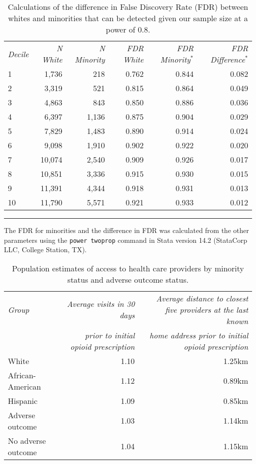 \documentclass[9pt,twoside]{pnas-new}
\begin{document}
\begin{table}
\caption{Calculations of the difference in False Discovery Rate (FDR) between whites and minorities that can be detected given our sample size at a power of 0.8.}
\centering
\begin{tabular}{lrrrrr}
\em Decile & \em N White & \em N Minority & \em FDR White & \em FDR Minority$^*$ & \em FDR Difference$^*$ \\[0.5em]
1 & 1,736 & 218 & 0.762 & 0.844 & 0.082 \\
2 & 3,319 & 521 & 0.815 & 0.864 & 0.049 \\
3 & 4,863 & 843 & 0.850 & 0.886 & 0.036 \\
4 & 6,397 & 1,136 & 0.875 & 0.904 & 0.029 \\
5 & 7,829 & 1,483 & 0.890 & 0.914 & 0.024 \\
6 & 9,098 & 1,910 & 0.902 & 0.922 & 0.020 \\
7 & 10,074 & 2,540 & 0.909 & 0.926 & 0.017 \\
8 & 10,851 & 3,336 & 0.915 & 0.930 & 0.015 \\
9 & 11,391 & 4,344 & 0.918 & 0.931 & 0.013 \\
10 & 11,790 & 5,571 & 0.921 & 0.933 & 0.012 \\[1em]
\end{tabular}
\hrule
\begin{tablenotes}
\footnotesize
\item * The FDR for minorities and the difference in FDR was calculated from the other parameters using the \texttt{power twoprop} command in Stata version 14.2 (StataCorp LLC, College Station, TX).
\end{tablenotes}
\end{table}

\begin{table}
\caption{Population estimates of access to health care providers by minority status and adverse outcome status.}
\centering
\begin{tabular}{lrr}
\em Group & \em Average visits in 30 days & \em Average distance to closest five providers at the last known \\
 & \em prior to initial opioid prescription & \em home address prior to initial opioid prescription \\[0.5em]
White & 1.10 & 1.25km \\
African-American & 1.12 & 0.89km \\
Hispanic & 1.09 & 0.85km \\[0.5em]
Adverse outcome & 1.03 & 1.14km \\
No adverse outcome & 1.04 & 1.15km
\end{tabular}
\end{table}
\end{document}
